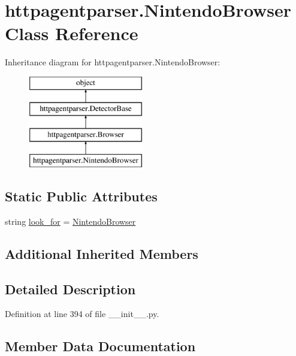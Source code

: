 \hypertarget{classhttpagentparser_1_1_nintendo_browser}{}\section{httpagentparser.\+Nintendo\+Browser Class Reference}
\label{classhttpagentparser_1_1_nintendo_browser}
Inheritance diagram for httpagentparser.\+Nintendo\+Browser\+:\begin{figure}[H]
\begin{center}
\leavevmode
\includegraphics[height=4.000000cm]{classhttpagentparser_1_1_nintendo_browser}
\end{center}
\end{figure}
\subsection*{Static Public Attributes}
\begin{DoxyCompactItemize}
\item 
string \hyperlink{classhttpagentparser_1_1_nintendo_browser_ab33070268dd23784f101661fd1c28d95}{look\+\_\+for} = \textquotesingle{}\hyperlink{classhttpagentparser_1_1_nintendo_browser}{Nintendo\+Browser}\textquotesingle{}
\end{DoxyCompactItemize}
\subsection*{Additional Inherited Members}


\subsection{Detailed Description}


Definition at line 394 of file \+\_\+\+\_\+init\+\_\+\+\_\+.\+py.



\subsection{Member Data Documentation}
\hypertarget{classhttpagentparser_1_1_nintendo_browser_ab33070268dd23784f101661fd1c28d95}{}\label{classhttpagentparser_1_1_nintendo_browser_ab33070268dd23784f101661fd1c28d95} 
